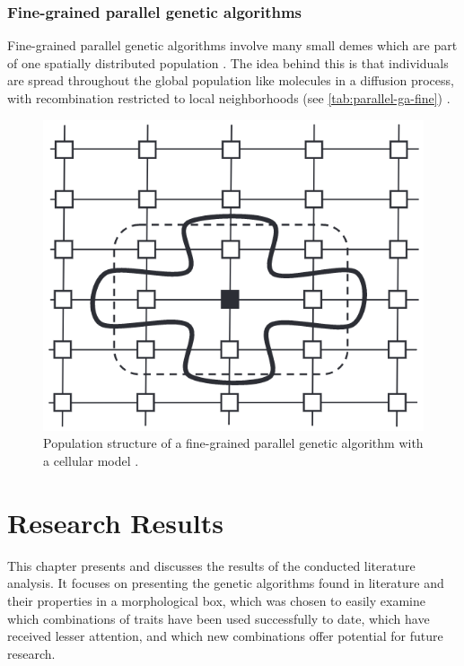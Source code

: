 \documentclass[sigconf]{acmart}
\begin{document}
\subsubsection{Fine-grained parallel genetic algorithms}
Fine-grained parallel genetic algorithms involve many small demes which are
part of one spatially distributed population \cite{Affenzeller2009}.
The idea behind this is that individuals are spread throughout the
global population like molecules in a diffusion process, with recombination
restricted to local neighborhoods (see \autoref{tab:parallel-ga-fine})
\cite{Affenzeller2009}.
\begin{figure}[h]
  \includegraphics[scale=0.24]{assets/parallel-ga-fine.png}
  \caption{
    Population structure of a fine-grained parallel genetic algorithm
    with a cellular model \cite{Affenzeller2009}.
  }
  \label{tab:parallel-ga-fine}
\end{figure}


\section{Research Results}
This chapter presents and discusses the results of the conducted literature
analysis. It focuses on presenting the genetic algorithms found in literature
and their properties in a morphological box, which was chosen to easily
examine which combinations of traits have been used successfully to date,
which have received lesser attention, and which new combinations offer potential
for future research.
\end{document}
